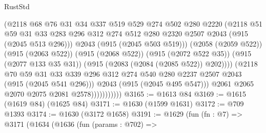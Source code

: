 \begin{lexlean}{RustStd}
\begin{coremodule}
                                (@2118
                                  @68
                                  @76
                                  @31
                                  @34
                                  @337
                                  @519
                                  @529
                                  @274
                                  @502
                                  @280
                                  @2220
                                  (@2118
                                    @51
                                    @59
                                    @31
                                    @33
                                    @283
                                    @296
                                    @312
                                    @274
                                    @512
                                    @280
                                    @2320
                                    @2507
                                    @2043
                                    (@915 (@2045 @513 @296)))
                                  @2043
                                  (@915 (@2045 @503 @519)))
                                (@2058 (@2059 @522))
                                (@915 (@2063 @522))
                                (@915 (@2068 @522))
                                (@915 (@2072 @522 @35))
                                (@915 (@2077 @133 @35 @31))
                                (@915 (@2083 (@2084 (@2085 @522)) @202))))
                            (@2118
                              @70
                              @59
                              @31
                              @33
                              @339
                              @296
                              @312
                              @274
                              @540
                              @280
                              @2237
                              @2507
                              @2043
                              (@915 (@2045 @541 @296)))
                            @2043
                            (@915 (@2045 @495 @547)))
                          @2061
                          @2065
                          @2070
                          @2075
                          @2081
                          @2578)))))))))))
@3165 := @1613 @84
@3169 := @1615 (@1619 @84) (@1625 @84)
@3171 := @1630 (@1599 @1631)
@3172 := @709 @1393
@3174 := @1630 (@3172 @1658)
@3191 := @1629
    (fun (fn : @7) =>
    @3171
      (@1634
        (@1636
          (fun (params : @702) =>

\end{coremodule}
\end{lexlean}
